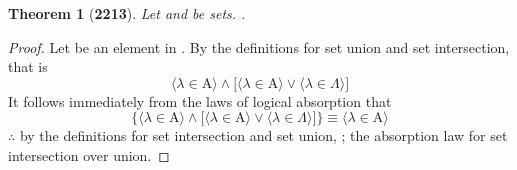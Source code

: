 \documentclass[preview]{standalone}
\newtheorem{theorem}{Theorem}
\begin{document}
\begin{theorem}[\textbf{2213}]
    Let  and \bm{$\Lambda$} be sets. 
    .
\end{theorem}
\begin{proof}
    Let \bm{$\lambda$} be an element in 
    . 
    By the definitions for set union and set intersection, that is 
    \begin{equation*}
        \Big \langle \lambda \in \mathrm{A} \Big \rangle 
            \land 
        \bigg[
            \Big \langle \lambda \in \mathrm{A} \Big \rangle 
                \lor 
            \Big \langle \lambda \in \Lambda \Big \rangle
        \bigg]
    \end{equation*}
    It follows immediately from the laws of logical absorption that
    \begin{equation*}
        \Bigg\{
            \Big \langle \lambda \in \mathrm{A} \Big \rangle 
                \land 
            \bigg[
                \Big \langle \lambda \in \mathrm{A} \Big \rangle 
                    \lor 
                \Big \langle \lambda \in \Lambda \Big \rangle
            \bigg]
        \Bigg\}
            \equiv
        \bigg \langle \lambda \in \mathrm{A} \bigg \rangle 
    \end{equation*}
    $\therefore$ by the definitions for set intersection and set union, 
    ; 
    the absorption law for set intersection over union. 
\end{proof}
\end{document}
